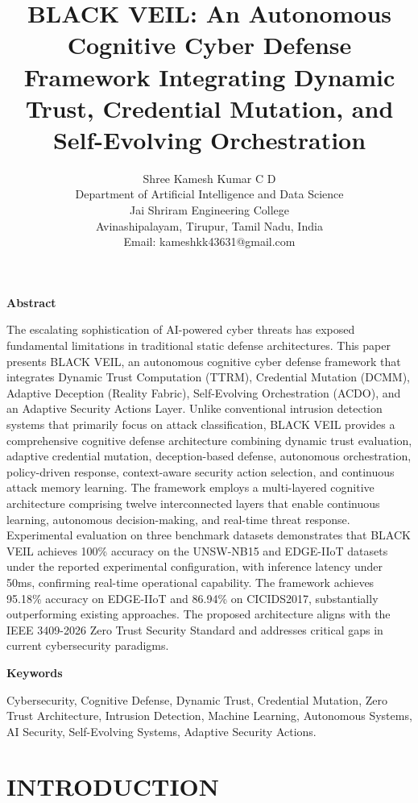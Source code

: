 \documentclass[12pt]{article}
\title{\textbf{BLACK VEIL: An Autonomous Cognitive Cyber Defense Framework Integrating Dynamic Trust, Credential Mutation, and Self-Evolving Orchestration}}
\author{
    \large{Shree Kamesh Kumar C D}\\
    Department of Artificial Intelligence and Data Science\\
    Jai Shriram Engineering College\\
    Avinashipalayam, Tirupur, Tamil Nadu, India\\
    Email: kameshkk43631@gmail.com
}
\date{}
\begin{document}
\maketitle

\begin{center}
\large{\textbf{Abstract}}
\end{center}

\noindent
The escalating sophistication of AI-powered cyber threats has exposed fundamental limitations in traditional static defense architectures. This paper presents BLACK VEIL, an autonomous cognitive cyber defense framework that integrates Dynamic Trust Computation (TTRM), Credential Mutation (DCMM), Adaptive Deception (Reality Fabric), Self-Evolving Orchestration (ACDO), and an Adaptive Security Actions Layer. Unlike conventional intrusion detection systems that primarily focus on attack classification, BLACK VEIL provides a comprehensive cognitive defense architecture combining dynamic trust evaluation, adaptive credential mutation, deception-based defense, autonomous orchestration, policy-driven response, context-aware security action selection, and continuous attack memory learning. The framework employs a multi-layered cognitive architecture comprising twelve interconnected layers that enable continuous learning, autonomous decision-making, and real-time threat response. Experimental evaluation on three benchmark datasets demonstrates that BLACK VEIL achieves 100\% accuracy on the UNSW-NB15 and EDGE-IIoT datasets under the reported experimental configuration, with inference latency under 50ms, confirming real-time operational capability. The framework achieves 95.18\% accuracy on EDGE-IIoT and 86.94\% on CICIDS2017, substantially outperforming existing approaches. The proposed architecture aligns with the IEEE 3409-2026 Zero Trust Security Standard and addresses critical gaps in current cybersecurity paradigms.

\vspace{4pt}

\begin{center}
\large{\textbf{Keywords}}
\end{center}

\noindent
Cybersecurity, Cognitive Defense, Dynamic Trust, Credential Mutation, Zero Trust Architecture, Intrusion Detection, Machine Learning, Autonomous Systems, AI Security, Self-Evolving Systems, Adaptive Security Actions.

\newpage

\section{INTRODUCTION}
\end{document}
